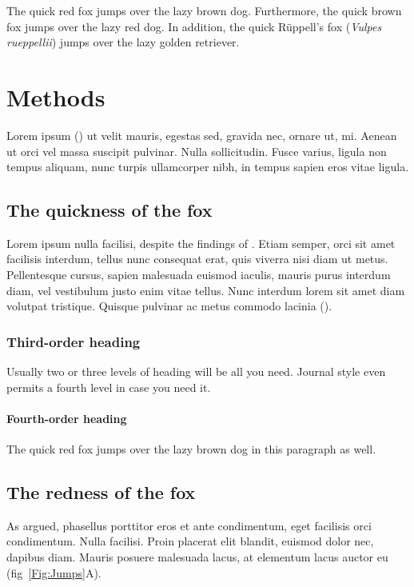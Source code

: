 \documentclass[11pt]{article}
\begin{document}
The quick red fox jumps over the lazy brown dog. Furthermore, the quick brown fox jumps over the lazy red dog. In addition, the quick R\"{u}ppell's fox (\textit{Vulpes rueppellii}) jumps over the lazy golden retriever.

\section*{Methods}

Lorem ipsum (\citealt{Xiao2015}) ut velit mauris, egestas sed, gravida nec, ornare ut, mi. Aenean ut orci vel massa suscipit pulvinar. Nulla sollicitudin. Fusce varius, ligula non tempus aliquam, nunc turpis ullamcorper nibh, in tempus sapien eros vitae ligula.

\subsection*{The quickness of the fox}

Lorem ipsum nulla facilisi, despite the findings of \citet{LemKapEx07}. Etiam semper, orci sit amet facilisis interdum, tellus nunc consequat erat, quis viverra nisi diam ut metus. Pellentesque cursus, sapien malesuada euismod iaculis, mauris purus interdum diam, vel vestibulum justo enim vitae tellus. Nunc interdum lorem sit amet diam volutpat tristique. Quisque pulvinar ac metus commodo lacinia (\citealt{Ing11,Xiao2015}).

\subsubsection*{Third-order heading}

Usually two or three levels of heading will be all you need. Journal style even permits a fourth level in case you need it.

\paragraph*{Fourth-order heading}
The quick red fox jumps over the lazy brown dog in this paragraph as well.


\subsection*{The redness of the fox}

As \citet{Xiao2015} argued, phasellus porttitor eros et ante condimentum, eget facilisis orci condimentum. Nulla facilisi. Proin placerat elit blandit, euismod dolor nec, dapibus diam. Mauris posuere malesuada lacus, at elementum lacus auctor eu (fig~\ref{Fig:Jumps}A).
\end{document}

